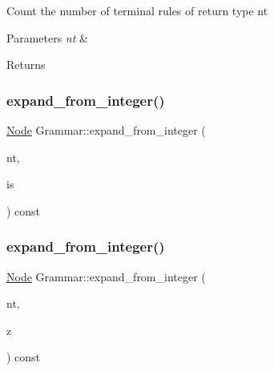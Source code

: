 Count the number of terminal rules of return type nt 
\begin{DoxyParams}{Parameters}
{\em nt} & \\
\hline
\end{DoxyParams}
\begin{DoxyReturn}{Returns}

\end{DoxyReturn}
\mbox{\label{class_grammar_a221f1a43488624ce78138d7d5045a816}} 
\subsubsection{\texorpdfstring{expand\+\_\+from\+\_\+integer()}{expand\_from\_integer()}\hspace{0.1cm}{\footnotesize\ttfamily [1/2]}}
{\footnotesize\ttfamily \hyperlink{class_node}{Node} Grammar\+::expand\+\_\+from\+\_\+integer (\begin{DoxyParamCaption}\item[{\hyperlink{_nonterminal_8h_a5c1f658dc7560600a16d22408bd716ca}{nonterminal\+\_\+t}}]{nt,  }\item[{\hyperlink{class_integerized_stack}{Integerized\+Stack} \&}]{is }\end{DoxyParamCaption}) const\hspace{0.3cm}{\ttfamily [inline]}}

\mbox{\label{class_grammar_a7b478d4ad5955b7489074e106afce5a4}} 
\subsubsection{\texorpdfstring{expand\+\_\+from\+\_\+integer()}{expand\_from\_integer()}\hspace{0.1cm}{\footnotesize\ttfamily [2/2]}}
{\footnotesize\ttfamily \hyperlink{class_node}{Node} Grammar\+::expand\+\_\+from\+\_\+integer (\begin{DoxyParamCaption}\item[{\hyperlink{_nonterminal_8h_a5c1f658dc7560600a16d22408bd716ca}{nonterminal\+\_\+t}}]{nt,  }\item[{\hyperlink{_numerics_8h_a9fe2bbca873b046b2bd276fc6856bb88}{enumerationidx\+\_\+t}}]{z }\end{DoxyParamCaption}) const\hspace{0.3cm}{\ttfamily [inline]}}


